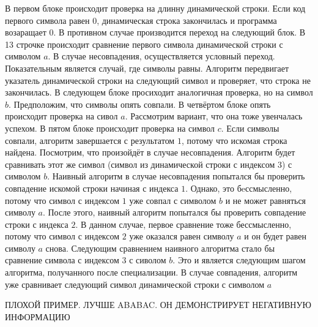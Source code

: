 \documentclass{spbau-diploma}
\begin{document}
В первом блоке происходит проверка на длинну динамической строки. Если код первого символа равен $0$, динамическая строка закончилась и программа возаращает $0$. В противном случае производится переход на следующий блок. В 13 строчке происходит сравнение первого символа динамической строки с символом $a$. В случае несовпадения, осуществляется условный переход. Показательным является случай, где символы равны. Алгоритм передвигает указатель динамической строки на следующий символ и проверяет, что строка не закончилась. В следующем блоке просиходит аналогичная проверка, но на символ $b$. Предположим, что символы опять совпали. В четвёртом блоке опять происходит проверка на сивол $a$. Рассмотрим вариант, что она тоже увенчалась успехом. В пятом блоке происходит проверка на символ $c$. Если символы совпали, алгоритм завершается с результатом $1$, потому что искомая строка найдена. Посмотрим, что произойдёт в случае несовпадения. Алгоритм будет сравнивать этот же символ (символ из динамической строки с индексом 3) с символом $b$. Наивный алгоритм в случае несовпадения попытался бы проверить совпадение искомой строки начиная с индекса $1$. Однако, это бeссмысленно, потому что символ с индексом $1$ уже совпал с символом $b$ и не может равняться символу $a$. После этого, наивный алгоритм попытался бы проверить совпадение строки с индекса $2$. В данном случае, первое сравнение тоже бессмысленно, потому что символ с индексом $2$ уже оказался равен символу $a$ и он будет равен символу $a$ снова. Следующим сравнением наивного алгоритма стало бы сравнение символа с индексом $3$ с сиволом $b$. Это и является следующим шагом алгоритма, получанного после специализации. В случае совпадения, алгоритм уже сравнивает следующий символ динамической строки с символом $a$ 


{\LARGE ПЛОХОЙ ПРИМЕР. ЛУЧШЕ ABABAC. ОН ДЕМОНСТРИРУЕТ НЕГАТИВНУЮ ИНФОРМАЦИЮ}
\end{document}

